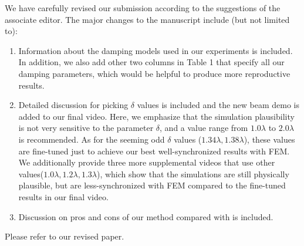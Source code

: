 We have carefully revised our submission according to the suggestions of the associate editor. The major changes to the manuscript include (but not limited to):
\begin{enumerate}
\item{Information about the damping models used in our experiments is included. In addition, we also add other two columns in Table 1 that specify all our damping parameters, which would be helpful to produce more reproductive results.}
    
\item{Detailed discussion for picking $\delta$ values is included and the new beam demo is added to our final video.
      Here, we emphasize that the simulation plausibility is not very
      sensitive to the parameter $\delta$, and a value range from $1.0\lambda$ to $2.0\lambda$ is recommended. 
      As for the seeming odd $\delta$ values ($1.34\lambda, 1.38\lambda$), these values are fine-tuned just to achieve our best well-synchronized results with FEM. We additionally provide three more supplemental videos that use other values($1.0\lambda,1.2\lambda,1.3\lambda$), which show that the simulations are still physically plausible, but are less-synchronized with FEM compared to the fine-tuned results in our final video.}
      
\item{Discussion on pros and cons of our method compared with \cite{Pauly:2005:MAF:1073204.1073296} is included.}
\end{enumerate}

Please refer to our revised paper.

%





